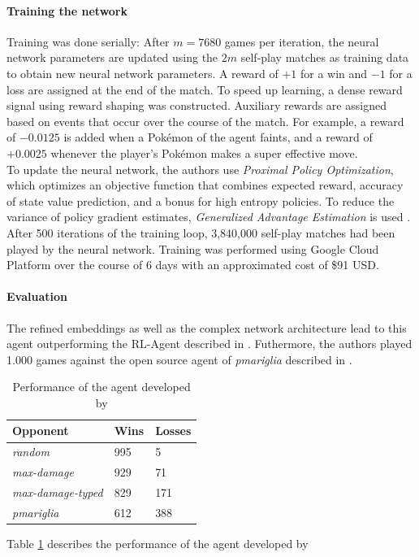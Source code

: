 \paragraph{Training the network}
Training was done serially: After $m = 7680$ games per iteration, the neural network parameters are updated
using the $2m$ self-play matches as training data to obtain new neural network parameters. A reward
of $+1$ for a win and $-1$ for a loss are assigned at the end of the match. To speed up learning, a 
dense reward signal using reward shaping was constructed. Auxiliary rewards are assigned based on
events that occur over the course of the match. For example, a reward of $-0.0125$ is added when a 
Pokémon of the agent faints, and a reward of $+0.0025$ whenever the player's Pokémon makes a 
super effective move. \\
To update the neural network, the authors use \textit{Proximal Policy Optimization}, which optimizes
an objective function that combines expected reward, accuracy of state value prediction, and a bonus
for high entropy policies. To reduce the variance of policy gradient estimates, \textit{Generalized
Advantage Estimation} is used . \\
After 500 iterations of the training loop, 3,840,000 self-play matches had been played by the neural
network. Training was performed using Google Cloud Platform over the course of 6 days with an 
approximated cost of \$91 USD.

\paragraph{Evaluation}
The refined embeddings as well as the complex network architecture lead to this agent outperforming
the RL-Agent described in \cite{GottaTrainEmAll}. Futhermore, the authors played 1.000 games against
the open source agent of \textit{pmariglia} described in .
\begin{table}[h]
    \centering
        \begin{tabular}{|l|l|l|}
            \hline
            \textbf{Opponent} & \textbf{Wins} & \textbf{Losses} \\
            \hline
            \emph{random} & 995 & 5 \\
            \hline
            \emph{max-damage} & 929 & 71 \\
            \hline
            \emph{max-damage-typed} & 829 & 171 \\
            \hline
            \emph{pmariglia} & 612 & 388 \\
            \hline
        \end{tabular}
        \caption{Performance of the agent developed by \cite{Huang_Lee_2019}}
        \label{tbl:State-Of-The-Art-Results}
\end{table} 
Table \ref{tbl:State-Of-The-Art-Results} describes the performance of the agent developed by
\cite{Huang_Lee_2019}

